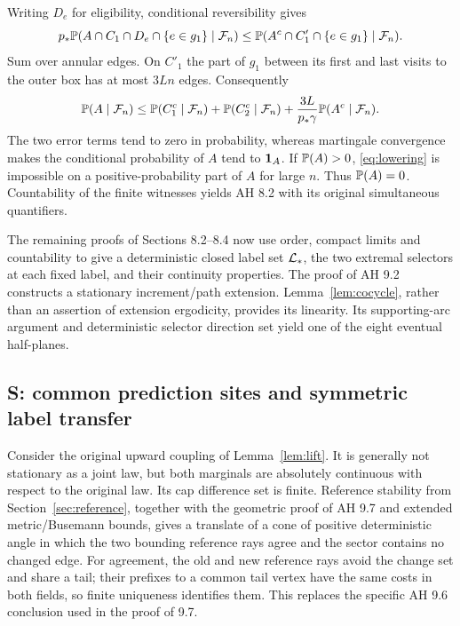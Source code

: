 Writing $D_e$ for eligibility, conditional reversibility gives
\[
 p_*\mathbb P(A\cap C_1\cap D_e\cap\{e\in g_1\}\mid\mathcal F_n)
 \le\mathbb P(A^c\cap C'_1\cap\{e\in g_1\}\mid\mathcal F_n).
\]
Sum over annular edges. On $C'_1$ the part of $g_1$ between its first and
last visits to the outer box has at most $3Ln$ edges. Consequently
\begin{equation}\label{eq:lowering}
 \mathbb P(A\mid\mathcal F_n)\le
 \mathbb P(C_1^c\mid\mathcal F_n)+\mathbb P(C_2^c\mid\mathcal F_n)
 +\frac{3L}{p_*\gamma}\mathbb P(A^c\mid\mathcal F_n).
\end{equation}
The two error terms tend to zero in probability, whereas martingale
convergence makes the conditional probability of $A$ tend to $\mathbf1_A$.
If $\mathbb P(A)>0$, \eqref{eq:lowering} is impossible on a positive-probability
part of $A$ for large $n$. Thus $\mathbb P(A)=0$. Countability of the finite
witnesses yields AH 8.2 with its original simultaneous quantifiers.

The remaining proofs of Sections 8.2--8.4 now use order, compact limits and
countability to give a deterministic closed label set $\mathcal L_*$, the two
extremal selectors at each fixed label, and their continuity properties.
The proof of AH 9.2 constructs a stationary increment/path extension.
Lemma~\ref{lem:cocycle}, rather than an assertion of extension ergodicity,
provides its linearity. Its supporting-arc argument and deterministic
selector direction set yield one of the eight eventual half-planes.

\subsection{S: common prediction sites and symmetric label transfer}
Consider the original upward coupling of Lemma~\ref{lem:lift}. It is
generally not stationary as a joint law, but both marginals are absolutely
continuous with respect to the original law. Its cap difference set is finite.
Reference stability from Section~\ref{sec:reference}, together with the
geometric proof of AH 9.7 and extended metric/Busemann bounds, gives a
translate of a cone of positive deterministic angle in which the two
bounding reference rays agree and the sector contains no changed edge.
For agreement, the old and new reference rays avoid the change set and
share a tail; their prefixes to a common tail vertex have the same costs
in both fields, so finite uniqueness identifies them. This replaces the
specific AH 9.6 conclusion used in the proof of 9.7.

